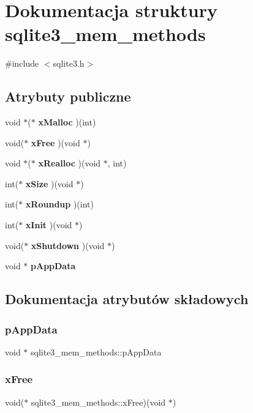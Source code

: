 \section{Dokumentacja struktury sqlite3\+\_\+mem\+\_\+methods}
\label{structsqlite3__mem__methods}


{\ttfamily \#include $<$sqlite3.\+h$>$}

\subsection*{Atrybuty publiczne}
\begin{DoxyCompactItemize}
\item 
void $\ast$($\ast$ \textbf{ x\+Malloc} )(int)
\item 
void($\ast$ \textbf{ x\+Free} )(void $\ast$)
\item 
void $\ast$($\ast$ \textbf{ x\+Realloc} )(void $\ast$, int)
\item 
int($\ast$ \textbf{ x\+Size} )(void $\ast$)
\item 
int($\ast$ \textbf{ x\+Roundup} )(int)
\item 
int($\ast$ \textbf{ x\+Init} )(void $\ast$)
\item 
void($\ast$ \textbf{ x\+Shutdown} )(void $\ast$)
\item 
void $\ast$ \textbf{ p\+App\+Data}
\end{DoxyCompactItemize}


\subsection{Dokumentacja atrybutów składowych}
\mbox{\label{structsqlite3__mem__methods_af91b7adfa1f6aace0b129bac800bd444}} 
\subsubsection{pAppData}
{\footnotesize\ttfamily void $\ast$ sqlite3\+\_\+mem\+\_\+methods\+::p\+App\+Data}

\mbox{\label{structsqlite3__mem__methods_aa2e7fe8d030adaa17fd23a44fec1eca1}} 
\subsubsection{xFree}
{\footnotesize\ttfamily void($\ast$ sqlite3\+\_\+mem\+\_\+methods\+::x\+Free)(void $\ast$)}

